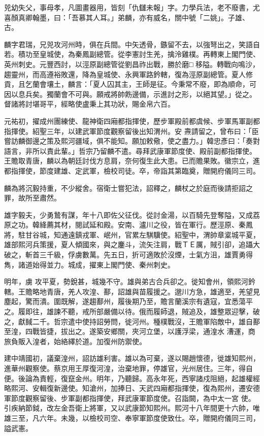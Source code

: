 \begin{pinyinscope}
 兕幼失父，事母孝，凡圖畫器用，皆刻「仇讎未報」字。力學兵法，老不廢書，尤喜顏真卿翰墨，曰：「吾慕其人耳。」弟麟，亦有威名，關中號「二姚」。子雄、古。



 麟字君瑞，兄兕攻河州時，俱在兵間。中矢透骨，鏃留不去，以強弩出之，笑語自若。積功至皇城使，為秦鳳副總管。從李憲討生羌，擒泠雞樸。再轉東上閣門使、英州刺史。元豐西討，以涇原副總管從劉昌祚出戰，勝於磨□
 移隘。轉戰向鳴沙，趨靈州，而高遵裕敗還，降為皇城使、永興軍路鈐轄，復為涇原副總管。夏人修貢，且乞蘭會壤土，麟言：「夏人囚其主，王師是征。今秉常不廢，即為順命，可因以息兵矣。獨蘭會不可與。願戒將帥飭邊備，示進討之形，以絕其望。」從之。督諸將討堪哥平，經略使盧秉上其功狀，賜金帛六百。



 元祐初，擢成州團練使、龍神衛四廂都指揮使，歷步軍殿前都虞候、步軍馬軍副都指揮使。紹聖三年，以建武軍節度觀察留後出知渭州。安
 燾請留之，曾布曰：「臣嘗訪麟御邊之策及熙河疆域，俱不能知。願加敕儆，使之盡力。」韓忠彥曰：「奏對語言，非所以責此輩。」哲宗乃留麟不遣。尋拜武康軍節度使、殿前副都指揮使。王贍取青唐，麟以為朝廷討伐方息肩，奈何復生此大患。已而贍果敗。徽宗立，進都指揮使，節度建雄、定武軍，檢校司徒。卒，帝詣其第臨奠，贈開府儀同三司。



 麟為將沉毅持重，不少縱舍。宿衛士嘗犯法，詔釋之，麟杖之於庭而後請拒詔之罪，故所至肅然。



 雄字毅夫，少勇鷙有謀，年十八即佐父征伐。從討金湯，以百騎先登奪隘，又成荔原之功。韓絳薦其材，閱試延和殿。安南、瀘川之役，皆在軍行。歷涇原、秦鳳將，駐甘谷城，知通遠鎮戎軍、岷州，官累左騏驥使。紹聖中，渭帥章楶城平夏，雄部熙河兵策援，夏人傾國來，與之鏖斗，流矢注肩，戰ＴＥ厲，賊引卻，追躡大破之，斬首三千級，俘虜數萬。先五日，折可適敗於沒煙，士氣方沮，雄賈勇得雋，諸道始得並力。城成，擢東上閣門使、秦州刺史。



 明年，虜
 攻平夏，勢銳甚，城幾不守。雄與弟古合兵卻之。徙知會州，領熙河鈐轄。王贍略地青唐，羌人攻湟、鄯，詔雄與苗履援之。邈川方急，雄適至，羌望見塵起，驚而潰。圍既解，遂趨鄯州，履後期乃至，贍言蘭溪宗有遺寇，宜悉蕩平之。履即往，雄諫不聽，戒所部嚴備以待。俄而履師退，賊追及，雄整眾迎擊，破之，獻馘二千。哲宗遣中使持詔勞問，徙河州。種樸戰沒，王贍軍陷敵中，雄自鄯至湟，四戰皆捷，拔出之。遂築安鄉關，夾河立堡，以護浮梁，通湟水
 漕運，商旅負販入湟者，始絡繹於道。加復州防禦使。



 建中靖國初，議棄湟州，詔訪雄利害。雄以為可棄，遂以賜趙懷德，徙雄知熙州，進華州觀察使。蔡京用王厚復河湟，治棄地罪，停雄官，光州居住。三年，得自便。後論為責輕，復竄金州。明年，乃聽歸。高永年死，西寧諸戍阻絕，起雄權經略熙河、安輯復新邊使。知滄州，加捧日、天武四廂都指揮使，復為熙州，遷安德軍節度觀察留後、步軍副都指揮使，拜武康軍節度使。召詣闕，為中太一宮
 使。引疾納節鉞，改左金吾衛上將軍，又以武康節知熙州。熙河十八年間更十六帥，唯雄三至，凡六年。未幾，以檢校司空、奉寧軍節度使致仕。卒，贈開府儀同三司，謚武憲。




\end{pinyinscope}
